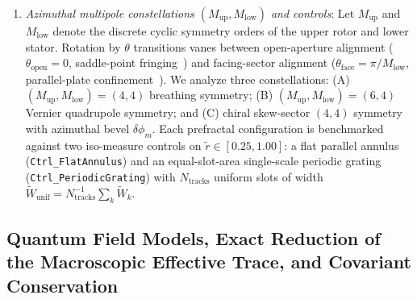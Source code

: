 \documentclass[aps,prd,twocolumn,10pt,showkeys,nofootinbib,floatfix,longbibliography]{revtex4-2}
\begin{document}
\begin{enumerate}
\begin{equation}
    \label{eq:homothetic_staging}
    \end{equation}
    with $\tilde{Z}_1 = 0.27$ and $\tilde{\tau}_1 = 0.054$, so rescaling $|\tilde{z}| \to |\tilde{z}|/b$ maps generation $m$ onto generation $m+1$.
    \item \emph{Azimuthal multipole constellations $(M_{\mathrm{up}}, M_{\mathrm{low}})$ and controls}: Let $M_{\mathrm{up}}$ and $M_{\mathrm{low}}$ denote the discrete cyclic symmetry orders of the upper rotor and lower stator. Rotation by $\theta$ transitions vanes between open-aperture alignment ($\theta_{\mathrm{open}} = 0$, saddle-point fringing~\cite{levin2010}) and facing-sector alignment ($\theta_{\mathrm{face}} = \pi/M_{\mathrm{low}}$, parallel-plate confinement~\cite{casimir1948,brown1969}). We analyze three constellations: (A) $(M_{\mathrm{up}}, M_{\mathrm{low}}) = (4,4)$ breathing symmetry; (B) $(M_{\mathrm{up}}, M_{\mathrm{low}}) = (6,4)$ Vernier quadrupole symmetry; and (C) chiral skew-sector $(4,4)$ symmetry with azimuthal bevel $\delta\phi_m$. Each prefractal configuration is benchmarked against two iso-measure controls on $\tilde{r}\in[0.25,1.00]$: a flat parallel annulus (\texttt{Ctrl\_FlatAnnulus}) and an equal-slot-area single-scale periodic grating (\texttt{Ctrl\_PeriodicGrating}) with $N_{\mathrm{tracks}}$ uniform slots of width $\tilde{W}_{\mathrm{unif}} = N_{\mathrm{tracks}}^{-1}\sum_k \tilde{W}_k$.
\end{enumerate}

\subsection{Quantum Field Models, Exact Reduction of the Macroscopic Effective Trace, and Covariant Conservation}
\label{subsec:effective_trace_covariant}
\end{document}
